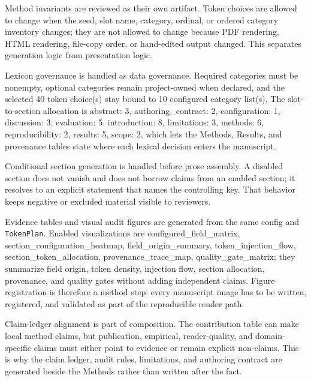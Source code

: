 \documentclass[
  english,
]{article}
\newcounter{none} %
\begin{document}
Method invariants are reviewed as their own artifact. Token choices are
allowed to change when the seed, slot name, category, ordinal, or
ordered category inventory changes; they are not allowed to change
because PDF rendering, HTML rendering, file-copy order, or hand-edited
output changed. This separates generation logic from presentation logic.

Lexicon governance is handled as data governance. Required categories
must be nonempty, optional categories remain project-owned when
declared, and the selected 40 token choice(s) stay bound to 10
configured category list(s). The slot-to-section allocation is abstract:
3, authoring\_contract: 2, configuration: 1, discussion: 3, evaluation:
5, introduction: 8, limitations: 3, methods: 6, reproducibility: 2,
results: 5, scope: 2, which lets the Methods, Results, and provenance
tables state where each lexical decision enters the manuscript.

Conditional section generation is handled before prose assembly. A
disabled section does not vanish and does not borrow claims from an
enabled section; it resolves to an explicit statement that names the
controlling  key. That behavior keeps
negative or excluded material visible to reviewers.

Evidence tables and visual audit figures are generated from the same
config and \texttt{TokenPlan}. Enabled visualizations are
configured\_field\_matrix, section\_configuration\_heatmap,
field\_origin\_summary, token\_injection\_flow,
section\_token\_allocation, provenance\_trace\_map,
quality\_gate\_matrix; they summarize field origin, token density,
injection flow, section allocation, provenance, and quality gates
without adding independent claims. Figure registration is therefore a
method step: every manuscript image has to be written, registered, and
validated as part of the reproducible render path.

Claim-ledger alignment is part of composition. The contribution table
can make local method claims, but publication, empirical,
reader-quality, and domain-specific claims must either point to evidence
or remain explicit non-claims. This is why the claim ledger, audit
rules, limitations, and authoring contract are generated beside the
Methods rather than written after the fact.
\end{document}
